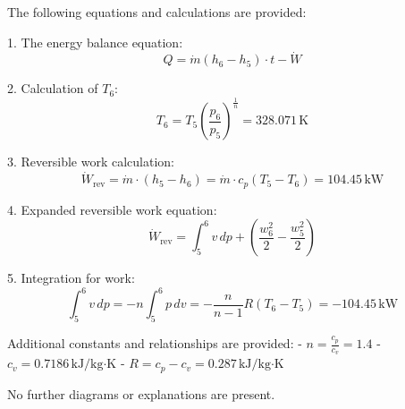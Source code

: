 The following equations and calculations are provided:  

1. The energy balance equation:  
\[
Q = \dot{m} (h_6 - h_5) \cdot t - \dot{W}
\]

2. Calculation of \( T_6 \):  
\[
T_6 = T_5 \left( \frac{p_6}{p_5} \right)^{\frac{1}{n}} = 328.071 \, \text{K}
\]

3. Reversible work calculation:  
\[
\dot{W}_{\text{rev}} = \dot{m} \cdot (h_5 - h_6) = \dot{m} \cdot c_p (T_5 - T_6) = 104.45 \, \text{kW}
\]

4. Expanded reversible work equation:  
\[
\dot{W}_{\text{rev}} = \int_5^6 v \, dp + \left( \frac{w_6^2}{2} - \frac{w_5^2}{2} \right)
\]

5. Integration for work:  
\[
\int_5^6 v \, dp = -n \int_5^6 p \, dv = -\frac{n}{n-1} R (T_6 - T_5) = -104.45 \, \text{kW}
\]

Additional constants and relationships are provided:  
- \( n = \frac{c_p}{c_v} = 1.4 \)  
- \( c_v = 0.7186 \, \text{kJ/kg·K} \)  
- \( R = c_p - c_v = 0.287 \, \text{kJ/kg·K} \)  

No further diagrams or explanations are present.